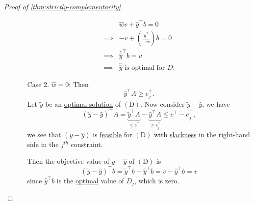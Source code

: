 \begin{proof}[Proof of \autoref{thm:strictly-complementarity}]
\begin{enumerate}
\begin{enumerate}
				      \[
					      \begin{split}
						      &\hat{w} v + \hat{y}^{\top}b = 0\\
						      \implies& -v + \left( \frac{\hat{y}^{\top}}{-\hat{w}} \right) b = 0\\
						      \implies& \hat{\hat{y}}^{\top}b = v\\
						      \implies& \hat{\hat{y}} \text{ is optimal for }D.
					      \end{split}
				      \]
			      \item[Case 2.] \(\hat{w} = 0\): Then
				      \[
					      \hat{y}^{\top}A\geq e_{j}^{\top}.
				      \]
				      Let \(\widetilde{y}\) be an \hyperref[def:optimal-solution]{optimal solution} of \((\mathrm{D})\). Now consider \(\widetilde{y} - \hat{y}\), we have
				      \[
					      \left(\widetilde{y} - \hat{y}\right)^{\top}A = \underbrace{\widetilde{y}^{\top}A}_{\leq c^{\top}} - \underbrace{\hat{y}^{\top}A}_{\geq e_{j}^{\top}} \leq c^{\top} - e_{j}^{\top},
				      \]
				      we see that \(\left( \widetilde{y} - \hat{y} \right) \) is \hyperref[def:feasible-solution]{feasible} for \((\mathrm{D})\) with \hyperref[def:slack-variable]{slackness} in the right-hand side in the \(j^{th}\) constraint.

				      Then the objective value of \(\widetilde{y}-\hat{y}\) of \((\mathrm{D})\) is
				      \[
					      \left( \widetilde{y}-\hat{y} \right)^{\top}b = \widetilde{y}^{\top}b - \hat{y}^{\top}b = v - \hat{y}^{\top}b = v
				      \]
				      since \(\hat{y}^{\top}b\) is the \hyperref[def:optimal-solution]{optimal} value of \(D_{j}\), which is zero.
		      \end{enumerate}
	\end{enumerate}


\end{proof}

